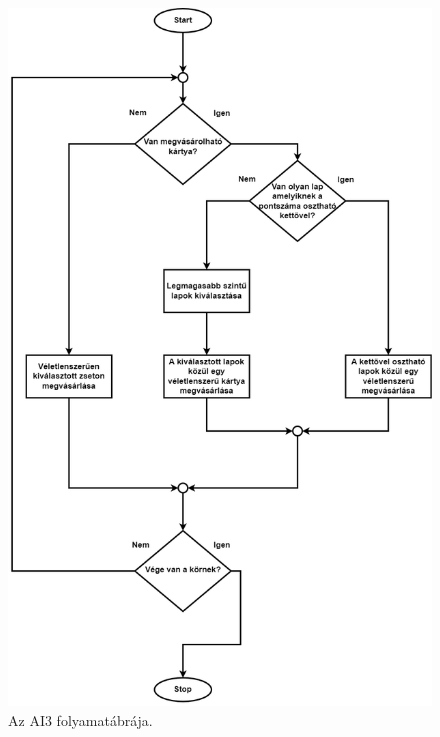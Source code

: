 \begin{figure}[h]
\centering
\includegraphics[scale=0.4]{images/thirdAI_flowchart.png}
\caption{Az AI3 folyamatábrája.}
\label{fig:AI3_flowchart}
\end{figure}

